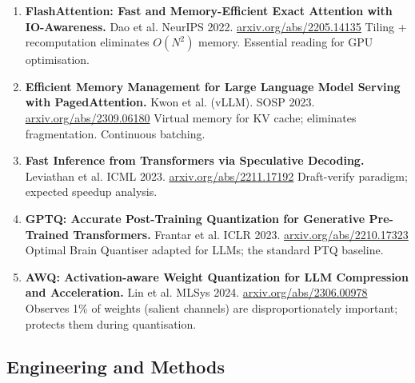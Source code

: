 \documentclass[11pt,a4paper]{article}
\begin{document}
\begin{enumerate}[leftmargin=2em,label=(\arabic*),start=11]
	\item \textbf{FlashAttention: Fast and Memory-Efficient Exact Attention with IO-Awareness.}
	      Dao et al. NeurIPS 2022. \href{https://arxiv.org/abs/2205.14135}{arxiv.org/abs/2205.14135}
	      \newline Tiling + recomputation eliminates $O(N^2)$ memory. Essential reading for GPU optimisation.

	\item \textbf{Efficient Memory Management for Large Language Model Serving with PagedAttention.}
	      Kwon et al. (vLLM). SOSP 2023. \href{https://arxiv.org/abs/2309.06180}{arxiv.org/abs/2309.06180}
	      \newline Virtual memory for KV cache; eliminates fragmentation. Continuous batching.

	\item \textbf{Fast Inference from Transformers via Speculative Decoding.}
	      Leviathan et al. ICML 2023. \href{https://arxiv.org/abs/2211.17192}{arxiv.org/abs/2211.17192}
	      \newline Draft-verify paradigm; expected speedup analysis.

	\item \textbf{GPTQ: Accurate Post-Training Quantization for Generative Pre-Trained Transformers.}
	      Frantar et al. ICLR 2023. \href{https://arxiv.org/abs/2210.17323}{arxiv.org/abs/2210.17323}
	      \newline Optimal Brain Quantiser adapted for LLMs; the standard PTQ baseline.

	\item \textbf{AWQ: Activation-aware Weight Quantization for LLM Compression and Acceleration.}
	      Lin et al. MLSys 2024. \href{https://arxiv.org/abs/2306.00978}{arxiv.org/abs/2306.00978}
	      \newline Observes 1\% of weights (salient channels) are disproportionately important; protects them during quantisation.
\end{enumerate}

\subsection*{Engineering and Methods}
\end{document}
